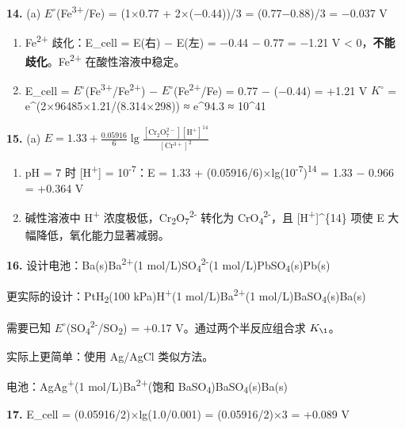 \textbf{14.}
(a) \(E^{\circ}\)(Fe\textsuperscript{3+}/Fe) = (1×0.77 + 2×(−0.44))/3 = (0.77−0.88)/3 = −0.037 V

\begin{enumerate}
\def\labelenumi{(\alph{enumi})}
\setcounter{enumi}{1}
\item
  Fe\textsuperscript{2+} 歧化：E\_cell = E(右) − E(左) = −0.44 − 0.77 = −1.21 V \textless{} 0，\textbf{不能歧化}。Fe\textsuperscript{2+} 在酸性溶液中稳定。
\item
  E\_cell = \(E^{\circ}\)(Fe\textsuperscript{3+}/Fe\textsuperscript{2+}) − \(E^{\circ}\)(Fe\textsuperscript{2+}/Fe) = 0.77 − (−0.44) = +1.21 V
  \(K^{\circ}\) = e\^{}(2×96485×1.21/(8.314×298)) ≈ e\^{}94.3 ≈ 10\^{}41
\end{enumerate}

\textbf{15.}
(a) \(E = 1.33 + \frac{0.05916}{6}\lg\frac{[\mathrm{Cr_2O_7^{2-}}][\mathrm{H^+}]^{14}}{[\mathrm{Cr^{3+}}]^2}\)

\begin{enumerate}
\def\labelenumi{(\alph{enumi})}
\setcounter{enumi}{1}
\item
  pH = 7 时 {[}H\textsuperscript{+}{]} = 10\textsuperscript{-7}：E = 1.33 + (0.05916/6)×lg(10\textsuperscript{-7})\textsuperscript{14} = 1.33 − 0.966 = +0.364 V
\item
  碱性溶液中 H\textsuperscript{+} 浓度极低，Cr\textsubscript{2}O\textsubscript{7}\textsuperscript{2-} 转化为 CrO\textsubscript{4}\textsuperscript{2-}，且 {[}H\textsuperscript{+}{]}\^{}\{14\} 项使 E 大幅降低，氧化能力显著减弱。
\end{enumerate}

\textbf{16.} 设计电池：Ba(s)\textbar Ba\textsuperscript{2+}(1 mol/L)\textbar\textbar SO\textsubscript{4}\textsuperscript{2-}(1 mol/L)\textbar PbSO\textsubscript{4}(s)\textbar Pb(s)

更实际的设计：Pt\textbar H\textsubscript{2}(100 kPa)\textbar H\textsuperscript{+}(1 mol/L)\textbar\textbar Ba\textsuperscript{2+}(1 mol/L)\textbar BaSO\textsubscript{4}(s)\textbar Ba(s)

需要已知 \(E^{\circ}\)(SO\textsubscript{4}\textsuperscript{2-}/SO\textsubscript{2}) = +0.17 V。通过两个半反应组合求 \(K_{\1}\)。

实际上更简单：使用 Ag/AgCl 类似方法。

电池：Ag\textbar Ag\textsuperscript{+}(1 mol/L)\textbar\textbar Ba\textsuperscript{2+}(饱和 BaSO\textsubscript{4})\textbar BaSO\textsubscript{4}(s)\textbar Ba(s)

\textbf{17.} E\_cell = (0.05916/2)×lg(1.0/0.001) = (0.05916/2)×3 = +0.089 V


